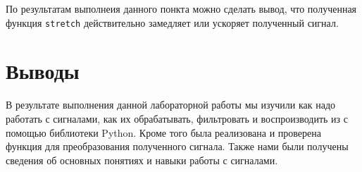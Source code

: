 \documentclass[a4paper]{article}
\begin{document}
            По результатам выполнеия данного понкта можно сделать вывод, что полученная функция \texttt{stretch} действительно замедляет или ускоряет полученный сигнал.
    
    \newpage
        \section{Выводы}
            В результате выполнения данной лабораторной работы мы изучили как надо работать с сигналами, как их обрабатывать, фильтровать и воспроизводить из с помощью библиотеки Python. Кроме того была реализована и проверена функция для преобразования полученного сигнала. Также нами были получены сведения об основных понятиях и навыки работы с сигналами. 
    
\end{document}
